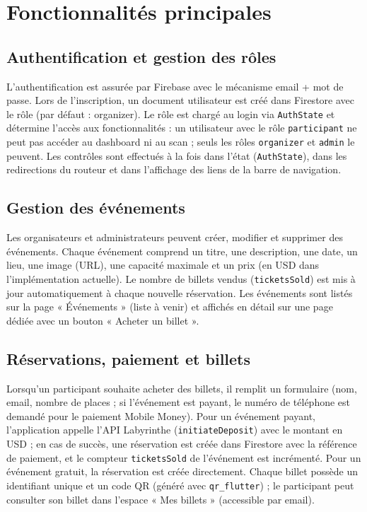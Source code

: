\documentclass[11pt,a4paper,oneside]{article}
\begin{document}
\section{Fonctionnalités principales}
\label{sec:fonctionnalites}

\subsection{Authentification et gestion des rôles}

L'authentification est assurée par Firebase avec le mécanisme email + mot de passe. Lors de l'inscription, un document utilisateur est créé dans Firestore avec le rôle (par défaut : organizer). Le rôle est chargé au login via \texttt{AuthState} et détermine l'accès aux fonctionnalités : un utilisateur avec le rôle \texttt{participant} ne peut pas accéder au dashboard ni au scan ; seuls les rôles \texttt{organizer} et \texttt{admin} le peuvent. Les contrôles sont effectués à la fois dans l'état (\texttt{AuthState}), dans les redirections du routeur et dans l'affichage des liens de la barre de navigation.

\subsection{Gestion des événements}

Les organisateurs et administrateurs peuvent créer, modifier et supprimer des événements. Chaque événement comprend un titre, une description, une date, un lieu, une image (URL), une capacité maximale et un prix (en USD dans l'implémentation actuelle). Le nombre de billets vendus (\texttt{ticketsSold}) est mis à jour automatiquement à chaque nouvelle réservation. Les événements sont listés sur la page « Événements » (liste à venir) et affichés en détail sur une page dédiée avec un bouton « Acheter un billet ».

\subsection{Réservations, paiement et billets}

Lorsqu'un participant souhaite acheter des billets, il remplit un formulaire (nom, email, nombre de places ; si l'événement est payant, le numéro de téléphone est demandé pour le paiement Mobile Money). Pour un événement payant, l'application appelle l'API Labyrinthe (\texttt{initiateDeposit}) avec le montant en USD ; en cas de succès, une réservation est créée dans Firestore avec la référence de paiement, et le compteur \texttt{ticketsSold} de l'événement est incrémenté. Pour un événement gratuit, la réservation est créée directement. Chaque billet possède un identifiant unique et un code QR (généré avec \texttt{qr\_flutter}) ; le participant peut consulter son billet dans l'espace « Mes billets » (accessible par email).
\end{document}
